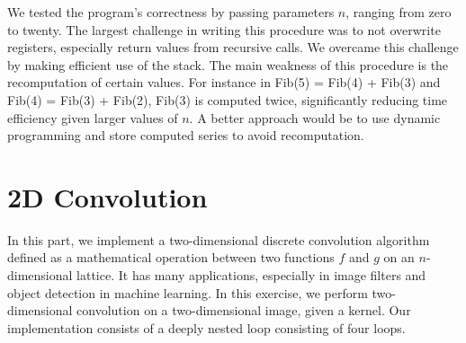 \documentclass[10pt]{article}
\begin{document}
We tested the program's correctness by passing parameters $n$, ranging from zero to twenty. The largest challenge in writing this procedure was to not overwrite registers, especially return values from recursive calls. We overcame this challenge by making efficient use of the stack. The main weakness of this procedure is the recomputation of certain values. For instance in Fib(5) = Fib(4) + Fib(3) and Fib(4) = Fib(3) + Fib(2), Fib(3) is computed twice, significantly reducing time efficiency given larger values of $n$. A better approach would be to use dynamic programming and store computed series to avoid recomputation.
\section{2D Convolution}
In this part, we implement a two-dimensional discrete convolution algorithm defined as a mathematical operation between two functions $f$ and $g$ on an $n$-dimensional lattice. It has many applications, especially in image filters and object detection in machine learning. In this exercise, we perform two-dimensional convolution on a two-dimensional image, given a kernel. Our implementation consists of a deeply nested loop consisting of four loops.\\
\end{document}

